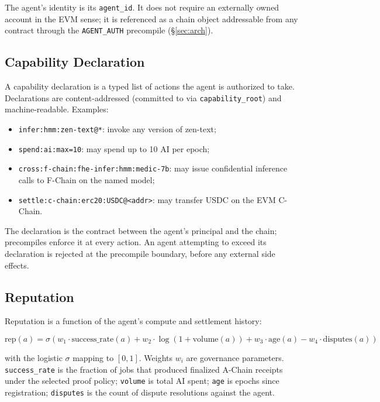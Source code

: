 The agent's identity is its \texttt{agent\_id}. It does not require an
externally owned account in the EVM sense; it is referenced as a chain
object addressable from any contract through the
\texttt{AGENT\_AUTH} precompile (\S\ref{sec:arch}).

\subsection{Capability Declaration}

A capability declaration is a typed list of actions the agent is
authorized to take. Declarations are content-addressed (committed to via
\texttt{capability\_root}) and machine-readable. Examples:

\begin{itemize}[leftmargin=1.2em]
  \item \texttt{infer:hmm:zen-text@*}: invoke any version of zen-text;
  \item \texttt{spend:ai:max=10}: may spend up to 10 AI per epoch;
  \item \texttt{cross:f-chain:fhe-infer:hmm:medic-7b}: may issue
        confidential inference calls to F-Chain on the named model;
  \item \texttt{settle:c-chain:erc20:USDC@<addr>}: may transfer USDC on
        the EVM C-Chain.
\end{itemize}

The declaration is the contract between the agent's principal and the
chain; precompiles enforce it at every action. An agent attempting to
exceed its declaration is rejected at the precompile boundary, before
any external side effects.

\subsection{Reputation}
\label{sec:reputation}

Reputation is a function of the agent's compute and settlement history:

\begin{equation}
  \text{rep}(a) = \sigma\!\left(
     w_1 \cdot \text{success\_rate}(a) +
     w_2 \cdot \log(1 + \text{volume}(a)) +
     w_3 \cdot \text{age}(a) -
     w_4 \cdot \text{disputes}(a)
  \right)
\end{equation}

with the logistic $\sigma$ mapping to $[0,1]$. Weights $w_i$ are
governance parameters. \texttt{success\_rate} is the fraction of jobs
that produced finalized A-Chain receipts under the selected proof policy;
\texttt{volume} is total AI
spent; \texttt{age} is epochs since registration;
\texttt{disputes} is the count of dispute resolutions against the agent.

